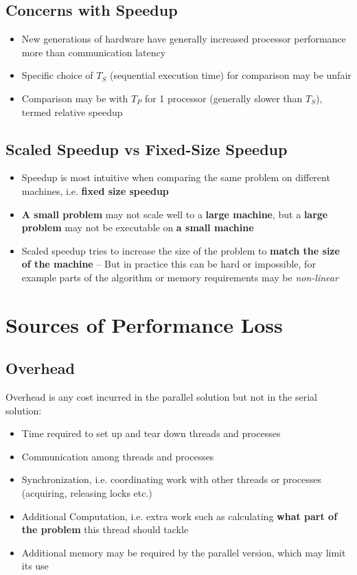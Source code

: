 \documentclass{article}
\begin{document}
\subsection{Concerns with Speedup}
\begin{itemize}
  \item New generations of hardware have generally increased processor performance more than communication latency
  \item Specific choice of $T_S$ (sequential execution time) for comparison may be unfair
  \item Comparison may be with $T_P$ for 1 processor (generally slower than $T_S$), termed relative speedup
\end{itemize}

\subsection{Scaled Speedup vs Fixed-Size Speedup}
\begin{itemize}
  \item Speedup is most intuitive when comparing the same problem on different machines, i.e. \textbf{fixed size speedup} 
  \item \textbf{A small problem} may not scale well to a \textbf{large machine}, but a \textbf{large problem} may not be executable on \textbf{a small machine}
  \item Scaled speedup tries to increase the size of the problem to \textbf{match the size of the machine} – But in practice this can be hard or impossible, for example parts of the algorithm or memory requirements may be \textit{non-linear}
\end{itemize}

\section{Sources of Performance Loss}

\subsection{Overhead}
\begin{flushleft}
Overhead is any cost incurred in the parallel solution but not in the serial solution:
\begin{itemize}
  \item Time required to set up and tear down threads and processes
  \item Communication among threads and processes
  \item Synchronization, i.e. coordinating work with other threads or processes (acquiring, releasing locks etc.)
  \item Additional Computation, i.e. extra work such as calculating \textbf{what part of the problem} this thread should tackle
  \item Additional memory may be required by the parallel version, which may limit its use
\end{itemize}
\end{flushleft}
\end{document}
